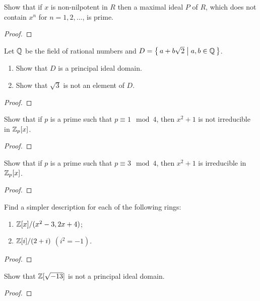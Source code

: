 \begin{problem}
Show that if $x$ is non-nilpotent in $R$ then a maximal ideal $P$ of $R$,
which does not contain $x^n$ for $n=1,2,...$, is prime.
\end{problem}
\begin{proof}
\end{proof}

\begin{problem}
Let $\mathbb{Q}$ be the field of rational numbers and
$D=\left\{\,a+b\sqrt{2}\;\middle|\;a,b\in\mathbb{Q}\,\right\}$.
\begin{enumerate}[label=(\alph*)]
\item Show that $D$ is a principal ideal domain.
\item Show that $\sqrt{3}$ is not an element of $D$.
\end{enumerate}
\end{problem}
\begin{proof}
\end{proof}

\begin{problem}
Show that if $p$ is a prime such that $p\equiv 1\mod 4$, then $x^2+1$ is
not irreducible in $\mathbb{Z}_p[x]$.
\end{problem}
\begin{proof}
\end{proof}

\begin{problem}
Show that if $p$ is a prime such that $p\equiv 3\mod 4$, then $x^2+1$ is
irreducible in $\mathbb{Z}_p[x]$.
\end{problem}
\begin{proof}
\end{proof}

\begin{problem}
Find a simpler description for each of the following rings:
\begin{enumerate}
\item $\mathbb{Z}[x]/(x^2-3,2x+4)$;
\item $\mathbb{Z}[i]/(2+i)$ $(i^2=-1)$.
\end{enumerate}
\end{problem}
\begin{proof}
\end{proof}

\begin{problem}
Show that $\mathbb{Z}[\sqrt{-13}]$ is not a principal ideal domain.
\end{problem}
\begin{proof}
\end{proof}

